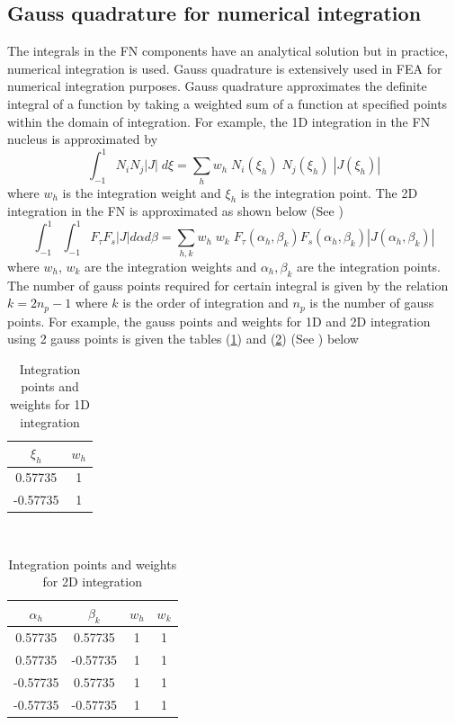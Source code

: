 \documentclass[a4paper,12pt]{article}
\begin{document}
\subsection*{Gauss quadrature for numerical integration}
\indent\indent\indent\indent The integrals in the FN components have an analytical solution but in practice, numerical integration is used. Gauss quadrature is extensively used in FEA for numerical integration purposes. Gauss quadrature approximates the definite integral of a function by taking a weighted sum of a function at specified points within the domain of integration. For example, the 1D integration in the FN nucleus is approximated by $$\int_{-1}^{1} N_{i} N_{j}|J|\;d\xi = \sum_{h}^{} w_{h}\; N_{i}(\xi_{h})\; N_{j}(\xi_{h})\;|J(\xi_{h})|$$ where $w_{h}$ is the integration weight and $\xi_{h}$ is the integration point. The 2D integration in the FN is approximated as shown below (See \cite{carrera2014finite})$$\int_{-1}^{1}\int_{-1}^{1} F_{\tau}F_{s} |J| d\alpha d\beta = \sum_{h,k}^{} w_{h}\;w_{k}\;  F_{\tau}(\alpha_{h},\beta_{k})F_{s}(\alpha_{h},\beta_{k}) |J(\alpha_{h},\beta_{k})|$$ where $w_{h}$,   $w_{k}$ are the integration weights and $\alpha_{h},\beta_{k}$ are the integration points.
The number of gauss points required for certain integral is given by the relation $ k = 2n_{p} - 1$ where $k$ is the order of integration and $n_{p}$ is the number of gauss points. For example, the gauss points and weights for 1D and 2D integration using 2 gauss points is given the tables (\ref{tab:table2}) and (\ref{tab:table3}) (See \cite{carrera2014finite}) below 
\begin{table}[h!]
  \begin{center}
     \begin{tabular}{c|c} 
      \textbf{$\xi_{h}$} & \textbf{$w_{h}$}\\
      \hline
      0.57735 & 1 \\
      -0.57735& 1 \\
       
    \end{tabular}
    \caption{Integration points and weights for 1D integration}
    \label{tab:table2}
  \end{center}
\end{table}\\
\begin{table}[h!]
  \begin{center}
     \begin{tabular}{c|c|c|c} 
      \textbf{$\alpha_{h}$} & \textbf{$\beta_{k}$} &     \textbf{$w_{h}$} & \textbf{$w_{k}$}\\
      \hline
      0.57735 & 0.57735 & 1 & 1\\
       0.57735 &-0.57735 &1 & 1\\
     -0.57735 & 0.57735 & 1 & 1\\
     -0.57735 &-0.57735 &1 & 1\\
    \end{tabular}
    \caption{Integration points and weights for 2D integration}
    \label{tab:table3}
  \end{center}
\end{table}
\end{document}
